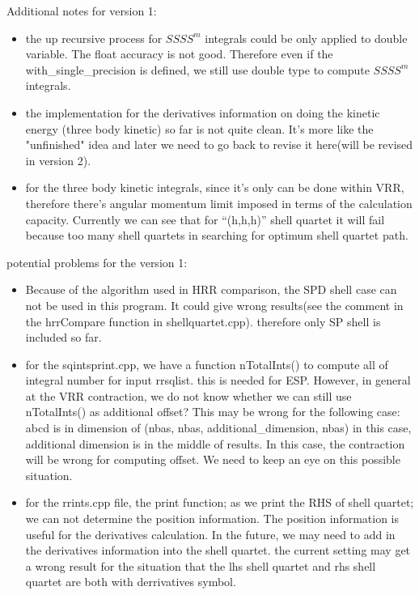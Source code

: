 Additional notes for version 1:
\begin{itemize}
 \item the up recursive process for $SSSS^{m}$ integrals could be
  only applied to double variable. The float accuracy
  is not good. Therefore even if the with\_single\_precision
  is defined, we still use double type to compute $SSSS^{m}$
  integrals.
 \item the implementation for the derivatives information on
  doing the kinetic energy (three body kinetic) so far
  is not quite clean. It's more like the "unfinished"
  idea and later we need to go back to revise it here(will be revised
  in version 2).
 \item for the three body kinetic integrals, since it's only
  can be done within VRR, therefore there's angular
  momentum limit imposed in terms of the calculation
  capacity. Currently we can see that for ``(h,h,h)''
  shell quartet it will fail because too many shell
  quartets in searching for optimum shell quartet path.
\end{itemize}

potential problems for the version 1:

\begin{itemize}
 \item Because of the algorithm used in HRR comparison,
  the SPD shell case can not be used in this program.
  It could give wrong results(see the comment in the
  hrrCompare function in shellquartet.cpp).
  therefore only SP shell is included so far.
 \item for the sqintsprint.cpp, we have a function nTotalInts()
  to compute all of integral number for input rrsqlist.
  this is needed for ESP. However, in general at the
  VRR contraction, we do not know whether we can still
  use nTotalInts() as additional offset? This may be
  wrong for the following case:
  abcd is in dimension of (nbas, nbas, additional\_dimension, nbas)
  in this case, additional dimension is in the middle
  of results. In this case, the contraction will be
  wrong for computing offset.
  We need to keep an eye on this possible situation.
 \item for the rrints.cpp file, the print function; as we
  print the RHS of shell quartet; we can not determine
  the position information. The position information
  is useful for the derivatives calculation. In the future,
  we may need to add in the derivatives information into
  the shell quartet.
  the current setting may get a wrong result for the
  situation that the lhs shell quartet and rhs shell
  quartet are both with derrivatives symbol.
\end{itemize}

